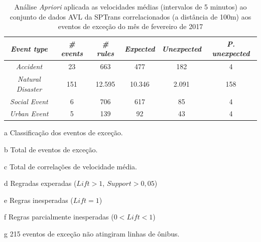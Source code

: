 \documentclass[
	12pt,				%
	oneside,			%
	a4paper,			%
	english,			%
	brazil				%
	]{abntex2ppgsi}
\begin{document}
\begin{apendicesenv}
\begin{table}[!htb]
\centering
\begin{threeparttable}
\caption {Análise \textit{Apriori} aplicada as velocidades médias (intervalos de 5 minutos) ao conjunto de dados AVL da SPTrans correlacionados (a distância de 100m) aos eventos de exceção do mês de fevereiro de 2017}
\label {tab:aprioriFull}
\begin{tabular}{c|c|c|c|c|c}
\hline
\textbf{\textit{Event type}}\tnote{a} & \textbf{\textit{\# events}}\tnote{b} & \textit{\textbf{\# rules}}\tnote{c} & \textbf{\textit{Expected}}\tnote{d} & \textbf{\textit{Unexpected}}\tnote{e} & \textbf{\textit{P. unexpected}}\tnote{f}   \\
\hline
\textit{Accident} & 23 & 663 & 477 & 182 & 4 \\
\textit{Natural Disaster} & 151 & 12.595 & 10.346 & 2.091 & 158 \\
\textit{Social Event} & 6 & 706 & 617 & 85 & 4 \\
\textit{Urban Event} & 5 & 139 & 92 & 43 & 4 \\
\hline
\end{tabular}
\begin{tablenotes}
            \item[a] Classificação dos eventos de exceção.
            \item[b] Total de eventos de exceção.
            \item[c] Total de correlações de velocidade média.
            \item[d] Regradas experadas ($Lift > 1$, $Support > 0,05$)
            \item[e] Regras inesperadas ($Lift = 1$)
            \item[f] Regras parcialmente inesperadas ($0 < Lift < 1$)
            \item[g] 215 eventos de exceção não atingiram linhas de ônibus.
        \end{tablenotes}
\end{threeparttable}
\end{table}


\end{apendicesenv}
\end{document}
